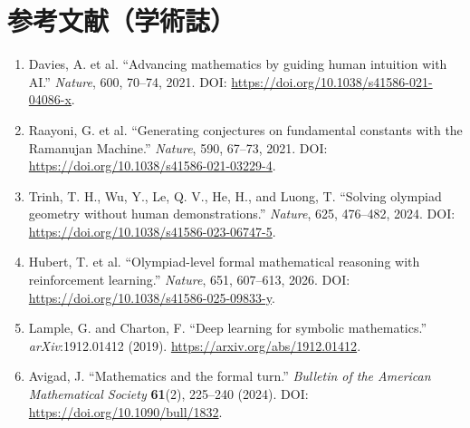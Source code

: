 \section*{参考文献（学術誌）}
\begin{enumerate}[leftmargin=2.4em]
\item Davies, A. et al. ``Advancing mathematics by guiding human intuition with AI.'' \textit{Nature}, 600, 70--74, 2021. DOI: \url{https://doi.org/10.1038/s41586-021-04086-x}.
\item Raayoni, G. et al. ``Generating conjectures on fundamental constants with the Ramanujan Machine.'' \textit{Nature}, 590, 67--73, 2021. DOI: \url{https://doi.org/10.1038/s41586-021-03229-4}.
\item Trinh, T. H., Wu, Y., Le, Q. V., He, H., and Luong, T. ``Solving olympiad geometry without human demonstrations.'' \textit{Nature}, 625, 476--482, 2024. DOI: \url{https://doi.org/10.1038/s41586-023-06747-5}.
\item Hubert, T. et al. ``Olympiad-level formal mathematical reasoning with reinforcement learning.'' \textit{Nature}, 651, 607--613, 2026. DOI: \url{https://doi.org/10.1038/s41586-025-09833-y}.
\item Lample, G. and Charton, F. ``Deep learning for symbolic mathematics.'' \textit{arXiv}:1912.01412 (2019). \url{https://arxiv.org/abs/1912.01412}.\item Avigad, J. ``Mathematics and the formal turn.'' \textit{Bulletin of the American Mathematical Society} \textbf{61}(2), 225--240 (2024). DOI: \url{https://doi.org/10.1090/bull/1832}.
\end{enumerate}


